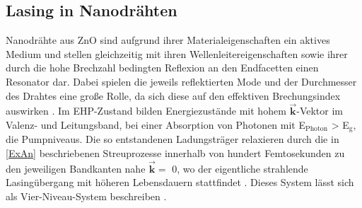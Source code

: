 \subsection{Lasing in Nanodrähten}
Nanodrähte aus ZnO sind aufgrund ihrer Materialeigenschaften ein aktives Medium und stellen gleichzeitig mit ihren Wellenleitereigenschaften sowie ihrer durch die hohe Brechzahl bedingten Reflexion an den Endfacetten einen Resonator dar. Dabei spielen die jeweils reflektierten Mode und der Durchmesser des Drahtes eine große Rolle, da sich diese auf den effektiven Brechungsindex auswirken \cite{Maslov.2003}. Im EHP-Zustand bilden Energiezustände mit hohem $\vec{\textbf{k}}$-Vektor im Valenz- und Leitungsband, bei einer Absorption von Photonen mit E$_{\text{Photon}}$ > E$_{\text{g}}$, die Pumpniveaus. Die so entstandenen Ladungsträger relaxieren durch die in \autoref{ExAn} beschriebenen Streuprozesse innerhalb von hundert Femtosekunden zu den jeweiligen Bandkanten nahe $\vec{\textbf{k}}=$ 0, wo der eigentliche strahlende Lasingübergang mit höheren Lebensdauern stattfindet \cite{Kneubuhl.2008}. Dieses System lässt sich als Vier-Niveau-System beschreiben \cite{Geburt.Diss}. 
